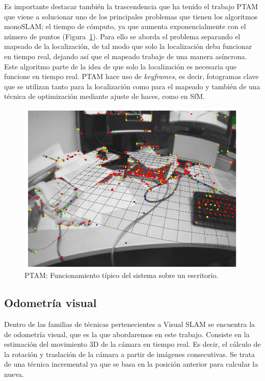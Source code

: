 Es importante destacar también la trascendencia que ha tenido el trabajo PTAM \parencite{Reference6} que viene a solucionar uno de los principales problemas que tienen los algoritmos monoSLAM; el tiempo de cómputo, ya que aumenta exponencialmente con el número de puntos (Figura~\ref{fig:Ptam}). Para ello se aborda el problema separando el mapeado de la localización, de tal modo que solo la localización deba funcionar en tiempo real, dejando así que el mapeado trabaje de una manera asíncrona. Este algoritmo parte de la idea de que solo la localización es necesaria que funcione en tiempo real. PTAM hace uso de \textit{keyframes}, es decir, fotogramas clave que se utilizan tanto para la localización como para el mapeado y también de una técnica de optimización mediante ajuste de haces, como en SfM.

\begin{figure}[th]
\centering
\includegraphics[scale=0.4]{Figures/ptam.png}
\decoRule
\caption[PTAM]{PTAM: Funcionamiento típico del sistema sobre un escritorio.}
\label{fig:Ptam}
\end{figure}

\subsection{Odometría visual}

Dentro de las familias de técnicas pertenecientes a Visual SLAM se encuentra la de odometría visual, que es la que abordaremos en este trabajo. Consiste en la estimación del movimiento 3D de la cámara en tiempo real. Es decir, el cálculo de la rotación y traslación de la cámara a partir de imágenes consecutivas. Se trata de una técnica incremental ya que se basa en la posición anterior para calcular la nueva.


